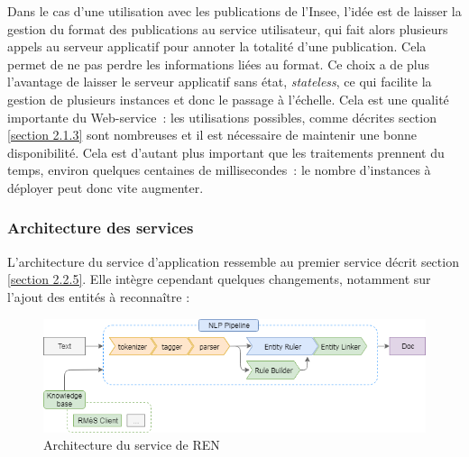 Dans le cas d'une utilisation avec les publications de l'Insee, l'idée est de laisser la gestion du format des publications au service utilisateur, qui fait alors plusieurs appels au serveur applicatif pour annoter la totalité d'une publication. Cela permet de ne pas perdre les informations liées au format. Ce choix a de plus l'avantage de laisser le serveur applicatif sans état, \textit{stateless}, ce qui facilite la gestion de plusieurs instances et donc le passage à l'échelle. Cela est une qualité importante du Web-service~: les utilisations possibles, comme décrites section \ref{section 2.1.3} sont nombreuses et il est nécessaire de maintenir une bonne disponibilité. Cela est d'autant plus important que les traitements prennent du temps, environ quelques centaines de millisecondes~: le nombre d'instances à déployer peut donc vite augmenter. 
\newline
\label{section 3.2.1}

\subsubsection*{Architecture des services}
L'architecture du service d'application ressemble au premier service décrit section \ref{section 2.2.5}. Elle intègre cependant quelques changements, notamment sur l'ajout des entités à reconnaître :
\vspace{10pt}
\begin{figure}[H]
    \centering
    \includegraphics[scale=0.7]{images/InspaCy-archi.png}
    \caption{Architecture du service de REN}
    \label{fig:inspacy-archi}
\end{figure}
\vspace{10pt}

